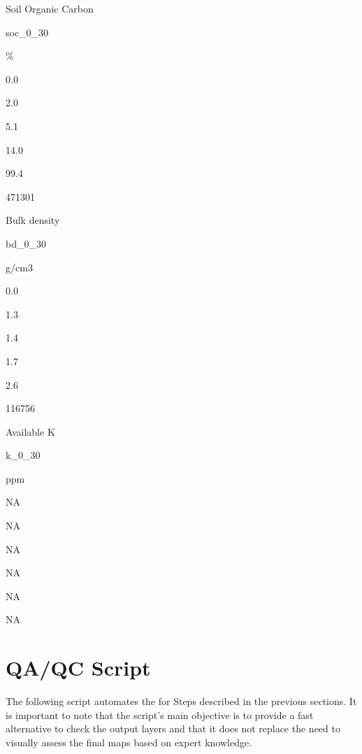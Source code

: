 \documentclass[
  10pt,
  b5paper,
  oneside]{book}
\begin{document}
Soil Organic Carbon

soc\_0\_30

\%

0.0

2.0

5.1

14.0

99.4

471301

Bulk density

bd\_0\_30

g/cm3

0.0

1.3

1.4

1.7

2.6

116756

Available K

k\_0\_30

ppm

NA

NA

NA

NA

NA

NA

\hypertarget{qaqc-script}{%
\section*{QA/QC Script}\label{qaqc-script}}

The following script automates the for Steps described in the previous sections. It is important to note that the script's main objective is to provide a fast alternative to check the output layers and that it does not replace the need to visually assess the final maps based on expert knowledge.
\end{document}
